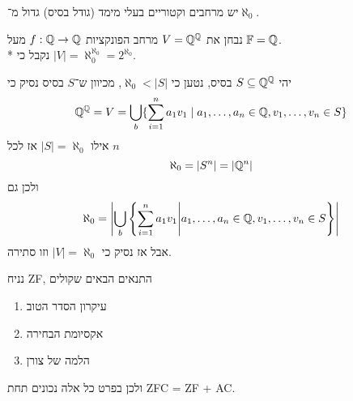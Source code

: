 \begin{remark}
	יש מרחבים וקטוריים בעלי מימד (גודל בסיס) גדול מ־$\aleph_0$.
\end{remark}
\begin{example}
	נבחן את $V = \mathbb{Q}^{\mathbb{Q}}$ מרחב הפונקציות $f : \mathbb{Q} \to \mathbb{Q}$ מעל $\mathbb{F} = \mathbb{Q}$. \\*
	נקבל כי $|V| = \aleph_0^{\aleph_0} = 2^{\aleph_0}$.

	יהי $S \subseteq \mathbb{Q}^{\mathbb{Q}}$ בסיס, נטען כי $\aleph_0 < |S|$, מכיוון ש־$S$ בסיס נסיק כי
	\[
		\mathbb{Q}^{\mathbb{Q}} = V = \bigcup_b \{ \sum_{i = 1}^{n} a_1 v_1 \mid a_1, \dots, a_n \in \mathbb{Q}, v_1, \dots, v_n \in S \}
	\]
	אילו $|S| = \aleph_0$ אז לכל $n$
	\[
		\aleph_0 = |S^n| = |\mathbb{Q}^n|
	\]
	ולכן גם
	\[
		\aleph_0 = \left\lvert \bigcup_b \left\{ \sum_{i = 1}^{n} a_1 v_1 \middle\vert a_1, \dots, a_n \in \mathbb{Q}, v_1, \dots, v_n \in S \right\} \right\rvert
	\]
	אבל אז נסיק כי $|V| = \aleph_0$ וזו סתירה.
\end{example}
\begin{theorem}
	נניח ZF, התנאים הבאים שקולים
	\begin{enumerate}
		\item עיקרון הסדר הטוב
		\item אקסיומת הבחירה
		\item הלמה של צורן
	\end{enumerate}
	ולכן בפרט כל אלה נכונים תחת ZFC = ZF + AC.\@
\end{theorem}
